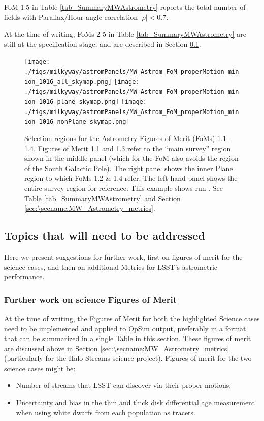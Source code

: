 FoM 1.5 in Table \ref{tab_SummaryMWAstrometry} reports the total number of fields with Parallax/Hour-angle correlation $|\rho| < 0.7$.

At the time of writing, FoMs 2-5 in Table
\ref{tab_SummaryMWAstrometry} are still at the specification stage,
and are described in Section
\ref{sec:\secname:MW_Astrometry_furtherwork}.


\begin{figure}[h]
  \begin{center}
    \texttt{[image: ./figs/milkyway/astromPanels/MW\_Astrom\_FoM\_properMotion\_minion\_1016\_all\_skymap.png]}
  \texttt{[image: ./figs/milkyway/astromPanels/MW\_Astrom\_FoM\_properMotion\_minion\_1016\_plane\_skymap.png]}
  \texttt{[image: ./figs/milkyway/astromPanels/MW\_Astrom\_FoM\_properMotion\_minion\_1016\_nonPlane\_skymap.png]}
    \end{center}
  \caption{Selection regions for the Astrometry Figures of Merit (FoMs) 1.1-1.4. Figures of Merit 1.1 and 1.3 refer to the ``main survey'' region shown in the middle panel (which for the FoM also avoids the region of the South Galactic Pole). The right panel shows the inner Plane region to which FoMs 1.2 \& 1.4 refer. The left-hand panel shows the entire survey region for reference. This example shows run . See Table \ref{tab_SummaryMWAstrometry} and Section \ref{sec:\secname:MW_Astrometry_metrics}.}
  \label{fig_astrom_RegionSelKey}
\end{figure}

\subsection{Topics that will need to be addressed}
\label{sec:\secname:MW_Astrometry_furtherwork}

Here we present suggestions for further work, first on figures of
merit for the science cases, and then on additional Metrics for LSST's
astrometric performance.

\subsubsection{Further work on science Figures of Merit}

At the time of writing, the Figures of Merit for both the highlighted
Science cases need to be implemented and applied to OpSim output,
preferably in a format that can be summarized in a single Table in
this section. These figures of merit are discussed above in Section
\ref{sec:\secname:MW_Astrometry_metrics} (particularly for the Halo
Streams science project). Figures of merit for the two science cases
might be:
\begin{itemize}
  \item[1.] Number of streams that LSST can discover via their proper motions;
\item[2.] Uncertainty and bias in the thin and thick disk differential age measurement when using white dwarfs from each population as tracers.
\end{itemize}

